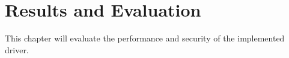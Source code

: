 \section{Results and Evaluation}
\label{sec:evaluation}
This chapter will evaluate the performance and security of the implemented driver.

